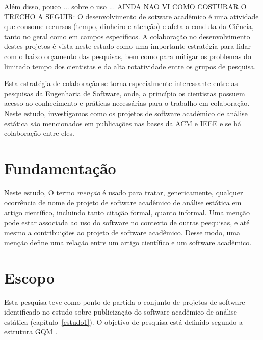 Além disso, pouco  ... sobre o uso ...
AINDA NAO VI COMO COSTURAR O TRECHO A SEGUIR:
O desenvolvimento de sotware acadêmico é uma atividade que consome recursos
(tempo, dinheiro e atenção) e afeta a conduta da Ciência, tanto no geral como
em campos específicos.
A colaboração no desenvolvimento destes projetos é vista
neste estudo como uma importante estratégia para lidar com o baixo orçamento
das pesquisas, bem como para mitigar os problemas do limitado tempo dos
cientistas e da alta rotatividade entre os grupos de pesquisa.

Esta estratégia de colaboração se torna especialmente interessante entre as
pesquisas da Engenharia de Software, onde, a princípio os cientistas possuem
acesso ao conhecimento e práticas necessárias para o trabalho em colaboração.
Neste estudo, investigamos como os projetos de software acadêmico
de análise estática são mencionados em publicações nas bases da ACM e IEEE e se
há colaboração entre eles.


\section{Fundamentação} \label{estudo2:fundamentacao}

Neste estudo,
O termo \textit{menção} é usado para tratar, genericamente, qualquer ocorrência de
nome de projeto de software acadêmico de análise estática em artigo científico,
incluindo tanto citação formal, quanto informal.
Uma menção pode estar associada ao uso do software no contexto de outras pesquisas,
e até mesmo a contribuições ao projeto de software acadêmico.
Desse modo, uma menção define uma relação entre um artigo científico e 
um software acadêmico.


\section{Escopo} \label{estudo2:escopo} %

Esta pesquisa teve como ponto de partida
o conjunto de projetos de software identificado
no estudo sobre publicização do software acadêmico de análise estática (capítulo~\ref{estudo1}).
O objetivo de pesquisa está definido segundo a estrutura GQM \cite{basili1994goal}.


